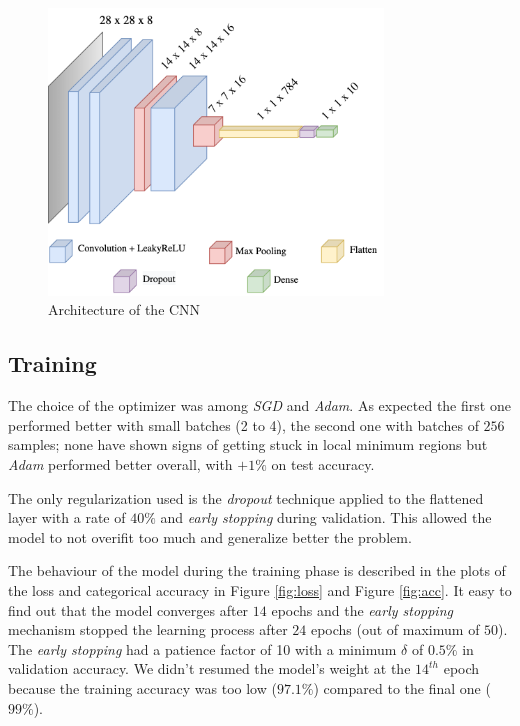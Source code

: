 \documentclass[compsoc]{IEEEtran}
\begin{document}
\begin{figure}[ht!]
\centering                                                                        
\includegraphics[width=3.5in]{cnn.png}
\captionsetup{justification=centering}                                                                                         
\caption{Architecture of the CNN}
\label{fig:cnn}                                                                                                                               
\end{figure}




\subsection{Training}
The choice of the optimizer was among \emph{SGD} and \emph{Adam}. As expected the first one performed better with small batches (2 to 4), the second one with batches of $256$ samples; 
none have shown signs of getting stuck in local minimum regions but \emph{Adam} performed better overall, with $+1\%$ on test accuracy. \par

The only regularization used is the \emph{dropout} technique applied to the flattened layer with a rate of $40\%$ and \emph{early stopping} during validation. This allowed the model to not overifit too much and generalize better the problem. \par
The behaviour of the model during the training phase is described in the plots of the loss and categorical accuracy in 
Figure \ref{fig:loss} and Figure \ref{fig:acc}. 
It easy to find out that the model converges after $14$ epochs and the \emph{early stopping} mechanism stopped the learning process after $24$ epochs (out of maximum of $50$). The \emph{early stopping} had a patience factor of 10 with a minimum $\delta$ of $0.5\%$ in validation accuracy.
We didn't resumed the model's weight at the $14^{th}$ epoch because the training accuracy was too low ($97.1\%$) compared to the final one ($99\%$).
\end{document}
